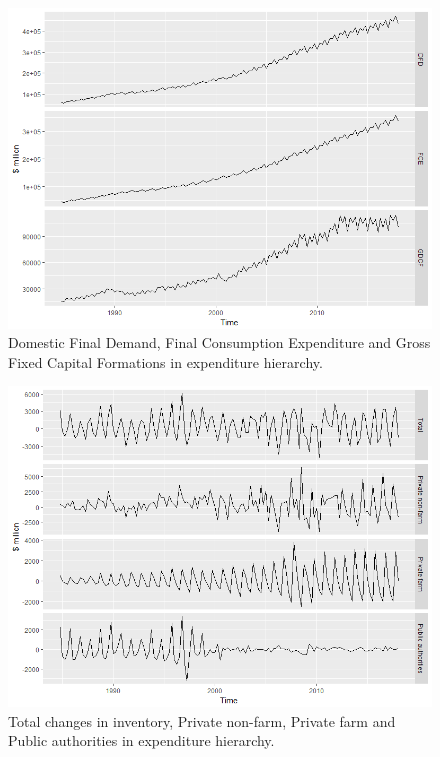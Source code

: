 \documentclass[graybox]{svmult}
\begin{document}
\begin{figure}[H]
	\centering
	\small
	\includegraphics[scale=0.5]{Figs/TS-plots/EXP-hierarchy/set-2.png}
	\caption{Domestic Final Demand, Final Consumption Expenditure and Gross Fixed Capital Formations in expenditure hierarchy.}\label{EXP-set-2}
\end{figure}

\begin{figure}[H]
	\centering
	\small
	\includegraphics[scale=0.5]{Figs/TS-plots/EXP-hierarchy/set-3.png}
	\caption{Total changes in inventory, Private non-farm, Private farm and Public authorities in expenditure hierarchy.}\label{EXP-set-3}
\end{figure}
\end{document}
